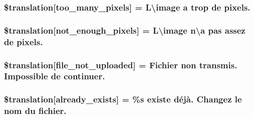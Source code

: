 \subsubsection[{\$translation}]{\setlength{\rightskip}{0pt plus 5cm}\$translation\mbox{[}\textquotesingle{}too\+\_\+many\+\_\+pixels\textquotesingle{}\mbox{]} = \textquotesingle{}L\textbackslash{}\textquotesingle{}image a trop de pixels.\textquotesingle{}}\label{class_8upload_8fr___f_r_8php_aa4051ef64e94a3f8295c63cf85544016}
\hypertarget{class_8upload_8fr___f_r_8php_a1fe342c27ce61f4ff4e0120ba647033e}{}
\subsubsection[{\$translation}]{\setlength{\rightskip}{0pt plus 5cm}\$translation\mbox{[}\textquotesingle{}not\+\_\+enough\+\_\+pixels\textquotesingle{}\mbox{]} = \textquotesingle{}L\textbackslash{}\textquotesingle{}image n\textbackslash{}\textquotesingle{}a pas assez de pixels.\textquotesingle{}}\label{class_8upload_8fr___f_r_8php_a1fe342c27ce61f4ff4e0120ba647033e}
\hypertarget{class_8upload_8fr___f_r_8php_a4ce76e7be0b3a03c2b47f6d70c21832e}{}
\subsubsection[{\$translation}]{\setlength{\rightskip}{0pt plus 5cm}\$translation\mbox{[}\textquotesingle{}file\+\_\+not\+\_\+uploaded\textquotesingle{}\mbox{]} = \textquotesingle{}Fichier non transmis. Impossible de continuer.\textquotesingle{}}\label{class_8upload_8fr___f_r_8php_a4ce76e7be0b3a03c2b47f6d70c21832e}
\hypertarget{class_8upload_8fr___f_r_8php_afd84e910217f04139f567c41e292afa5}{}
\subsubsection[{\$translation}]{\setlength{\rightskip}{0pt plus 5cm}\$translation\mbox{[}\textquotesingle{}already\+\_\+exists\textquotesingle{}\mbox{]} = \textquotesingle{}\%s existe déjà. Changez le nom du fichier.\textquotesingle{}}\label{class_8upload_8fr___f_r_8php_afd84e910217f04139f567c41e292afa5}
\hypertarget{class_8upload_8fr___f_r_8php_ab0fa87a88aba2624004581eed0633325}{}
